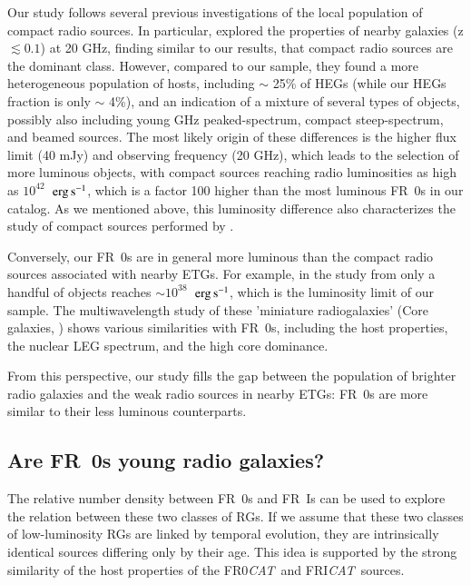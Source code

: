 \documentclass[traditabstract]{aa}
\newcommand{\ergs}{\>{\rm erg}\,{\rm s}^{-1}}
\newcommand{\FR}{FRI{\sl{CAT}}}\newcommand{\FRII}{FRII{\sl{CAT}}}
\newcommand{\FRo}{FR0{\sl{CAT}}}
\begin{document}
Our study follows several previous investigations of the local
population of compact radio sources. In particular, \citet{sadler14}
explored the properties of nearby galaxies (z $\lesssim 0.1$) at 20
GHz, finding similar to our results, that compact radio sources are
the dominant class. However, compared to our sample, they found a more
heterogeneous population of hosts, including $\sim$ 25\% of HEGs
(while our HEGs fraction is only $\sim$ 4\%), and an indication of a
mixture of several types of objects, possibly also including young
GHz peaked-spectrum, compact steep-spectrum, and beamed
sources. The most likely origin of these differences is the higher
flux limit (40 mJy) and observing frequency (20 GHz), which leads to
the selection of more luminous objects, with compact sources reaching
radio luminosities as high as $10^{42}$ $\ergs$, which is a factor 100
higher than the most luminous FR~0s in our catalog. As we mentioned
above, this luminosity difference also characterizes the study of
compact sources performed by \citet{miraghaei17}.

Conversely, our FR~0s are in general more luminous than the compact
radio sources associated with nearby ETGs. For example, in the study
from \citet{wrobel91b} only a handful of objects reaches
$\sim 10^{38}$ $\ergs$, which is the luminosity limit of our
sample. The multiwavelength study of these 'miniature radiogalaxies'
(Core galaxies, \citealt{balmaverde06core}) shows various similarities
with FR~0s, including the host properties, the nuclear LEG spectrum,
and the high core dominance.

  From this perspective, our study fills the gap between the
  population of brighter radio galaxies and the weak radio sources in
  nearby ETGs: FR~0s are more similar to their less luminous
  counterparts.


\subsection{Are FR~0s young radio galaxies?}

The relative number density between FR~0s and FR~Is can be used to
explore the relation between these two classes of RGs. If we assume
that these two classes of low-luminosity RGs are linked by temporal
evolution, they are intrinsically identical sources differing
only by their age. This idea is supported by the strong similarity of
the host properties of the \FRo\ and \FR\ sources.
\end{document}
